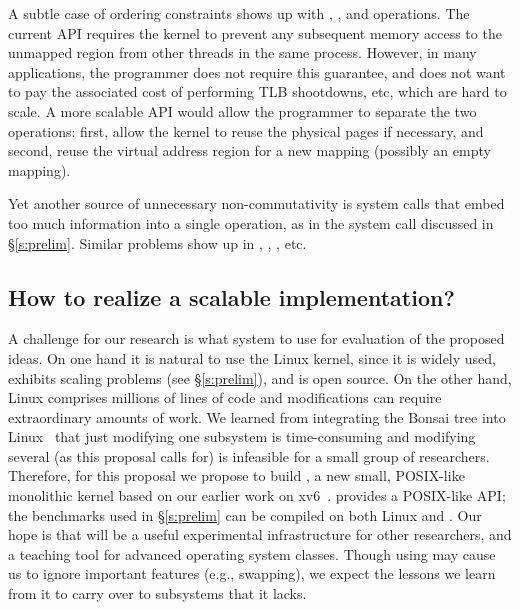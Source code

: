 A subtle case of ordering constraints shows up with ,
, and  operations.  The current API requires
the kernel to prevent any subsequent memory access to the unmapped region
from other threads in the same process.  However, in many applications,
the programmer does not require this guarantee, and does not want to pay
the associated cost of performing TLB shootdowns, etc, which are hard
to scale.  A more scalable API would allow the programmer to separate the
two operations: first, allow the kernel to reuse the physical pages if
necessary, and second, reuse the virtual address region for a new mapping
(possibly an empty mapping).

Yet another source of unnecessary non-commutativity is system calls that
embed too much information into a single operation, as in the
 system call discussed in \S\ref{s:prelim}. Similar problems show
up in , ,
, etc.


\subsection{How to realize a scalable implementation?}

A challenge for our research is what system to use for evaluation of
the proposed ideas.  On one hand it is natural to use the Linux kernel,
since it is widely used, exhibits scaling problems (see \S\ref{s:prelim}),
and is open source.  On the other hand, Linux comprises millions of
lines of code and modifications can require extraordinary amounts of work.
We learned from integrating the
Bonsai tree into Linux~\cite{clements:bonsai} that just modifying one subsystem
is time-consuming and modifying several (as this proposal calls for)
is infeasible for a small group of researchers.  Therefore, for this
proposal we propose to build \sys, a new small, POSIX-like monolithic
kernel based on our earlier work on xv6~\cite{xv6}.  \sys provides a
POSIX-like API; the benchmarks used in \S\ref{s:prelim} can be compiled on
both Linux and \sys.  Our hope is that \sys will be a useful experimental
infrastructure for other researchers, and a teaching tool for advanced
operating system classes. Though using \sys may cause us to ignore
important features (e.g., swapping), we expect the lessons we learn
from it to carry over to subsystems that it lacks.

